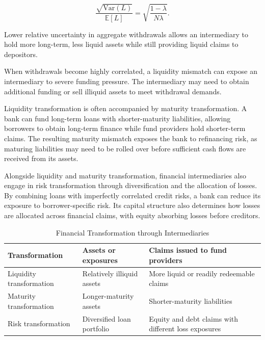 \begin{equation}
\frac{\sqrt{\mathrm{Var}(L)}}{\mathbb{E}[L]}
=
\sqrt{\frac{1-\lambda}{N\lambda}}.
\label{eq:ch4-liquidity-relative-risk}
\end{equation}

Lower relative uncertainty in aggregate withdrawals allows an intermediary to hold more long-term, less liquid assets while still providing liquid claims to depositors.

When withdrawals become highly correlated, a liquidity mismatch can expose an intermediary to severe funding pressure. The intermediary may need to obtain additional funding or sell illiquid assets to meet withdrawal demands.

Liquidity transformation is often accompanied by maturity transformation. A bank can fund long-term loans with shorter-maturity liabilities, allowing borrowers to obtain long-term finance while fund providers hold shorter-term claims. The resulting maturity mismatch exposes the bank to refinancing risk, as maturing liabilities may need to be rolled over before sufficient cash flows are received from its assets.

Alongside liquidity and maturity transformation, financial intermediaries also engage in risk transformation through diversification and the allocation of losses. By combining loans with imperfectly correlated credit risks, a bank can reduce its exposure to borrower-specific risk. Its capital structure also determines how losses are allocated across financial claims, with equity absorbing losses before creditors.

\begin{table}[htbp]
\centering
\caption{Financial Transformation through Intermediaries}
\label{tab:ch4-transformation}

\renewcommand{\arraystretch}{1.15}

\begin{tabularx}{\textwidth}{
@{}
>{\raggedright\arraybackslash}p{3.2cm}
>{\raggedright\arraybackslash}X
>{\raggedright\arraybackslash}X
@{}
}

\toprule
\textbf{Transformation}
& \textbf{Assets or exposures}
& \textbf{Claims issued to fund providers} \\
\midrule

Liquidity transformation
& Relatively illiquid assets
& More liquid or readily redeemable claims \\

Maturity transformation
& Longer-maturity assets
& Shorter-maturity liabilities \\

Risk transformation
& Diversified loan portfolio
& Equity and debt claims with different loss exposures \\

\bottomrule
\end{tabularx}

\end{table}



